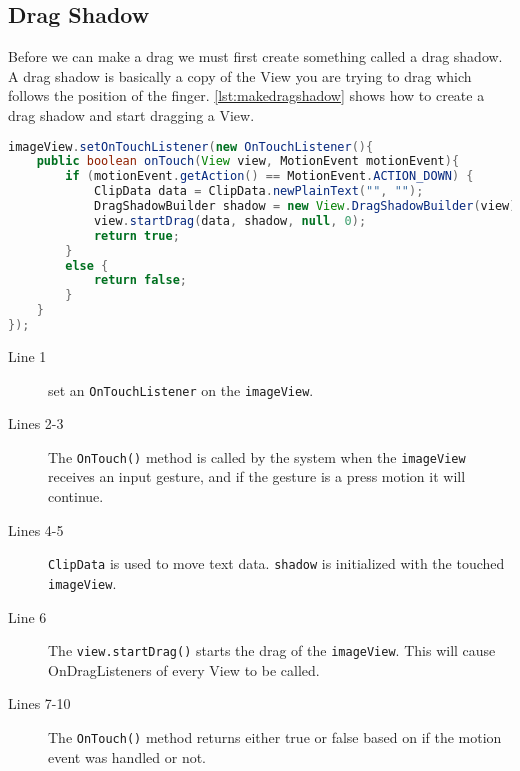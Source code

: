\subsection*{Drag Shadow}
Before we can make a drag we must first create something called a drag shadow. A drag shadow is basically a copy of the View you are trying to drag which follows the position of the finger. \autoref{lst:makedragshadow} shows how to create a drag shadow and start dragging a View.
\begin{lstlisting}[language=java,firstnumber=1,caption={How to create a drag shadow, and start drag},label=lst:makedragshadow]
imageView.setOnTouchListener(new OnTouchListener(){
	public boolean onTouch(View view, MotionEvent motionEvent){
		if (motionEvent.getAction() == MotionEvent.ACTION_DOWN) {
			ClipData data = ClipData.newPlainText("", "");
			DragShadowBuilder shadow = new View.DragShadowBuilder(view);
			view.startDrag(data, shadow, null, 0);
			return true;
		}
		else {
			return false;
		}	
	}
});
\end{lstlisting}
\begin{description}
\item[Line 1] set an \lstinline|OnTouchListener| on the \lstinline|imageView|.
\item[Lines 2-3] The \lstinline|OnTouch()| method is called by the system when the \lstinline|imageView| receives an input gesture, and if the gesture is a press motion it will continue.
\item[Lines 4-5] \lstinline|ClipData| is used to move text data. \lstinline|shadow| is initialized with the touched \lstinline|imageView|.

\item[Line 6] The \lstinline|view.startDrag()| starts the drag of the \lstinline|imageView|. This will cause OnDragListeners of every View to be called.

\item[Lines 7-10] The \lstinline|OnTouch()| method returns either true or false based on if the motion event was handled or not.
\end{description}
